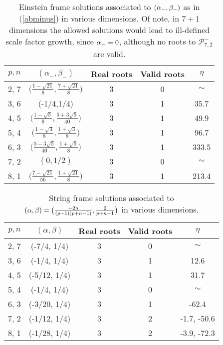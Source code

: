 \documentclass[amsmath,amssymb,11pt]{article}
\begin{document}

\begin{table}[H]
\begin{center}
\begin{tabular}{c| c | c | c | c }
$p,n$ & $(\alpha_-,\beta_-)$ & Real roots & Valid roots & $\eta$ \\ \hline 
2, 7 & $\Big(\frac{1-\sqrt{21}}{8},\frac{7+\sqrt{21}}{8}\Big)$  & 3 & 0& $\sim$ \\
3, 6 & (-1/4,1/4) & 3 & 1 & 35.7 \\
4, 5 & $\Big(\frac{1-\sqrt{5}}{8},\frac{5+3\sqrt{5}}{40}\Big)$ &  3 & 1 & 49.9 \\
5, 4 & $\Big(\frac{1-\sqrt{3}}{8}, \frac{1+\sqrt{3}}{8}\Big)$ &  3 & 1 & 96.7 \\
6, 3 & $\Big(\frac{5-3\sqrt{5}}{40}, \frac{1+\sqrt{5}}{8}\Big)$ &  3 & 1 & 333.5 \\
7, 2 & $(0,1/2)$ & 3 & 0 & $\sim$ \\
8, 1 & $\Big(\frac{7 - \sqrt{21}}{56}, \frac{1+\sqrt{21}}{8}\Big)$ & 3 & 1 &  213.4
\end{tabular}
\end{center}
\caption{Einstein frame solutions associated to $(\alpha_-,\beta_-)$ as in (\ref{abminus}) in various dimensions. Of note, in $7+1$ dimensions the allowed solutions would lead to ill-defined scale factor growth, since $\alpha_-=0$, although no roots to $\mathcal{P}^{-}_{7,2}$ are valid. }
\label{minussolstable2}\end{table}




\begin{table}[H]
\begin{center}
\begin{tabular}{c| c | c | c | c }
$p,n$ & $(\alpha,\beta)$ & Real roots & Valid roots & $\eta$ \\ \hline 
2, 7 & (-7/4, 1/4)  & 3 & 0& $\sim$ \\
3, 6 & (-1/4, 1/4) & 3 & 1 & 12.6 \\
4, 5 & (-5/12, 1/4) &  3 & 1 & 31.7 \\
5, 4 & (-1/4, 1/4) &  3 & 0 & $\sim$ \\
6, 3 & (-3/20, 1/4) &  3 & 1 & -62.4 \\
7, 2 & (-1/12, 1/4) & 3 & 2 & -1.7, -50.6 \\
8, 1 & (-1/28, 1/4) & 3 & 2 &  -3.9, -72.3
\end{tabular}
\end{center}
\caption{String frame solutions associated to $(\alpha,\beta)=\big(\frac{-2n}{(p-1)(p+n-1)},\frac{2}{p+n-1}\big)$ in various dimensions. }
\label{stringtable}\end{table}
\end{document}
